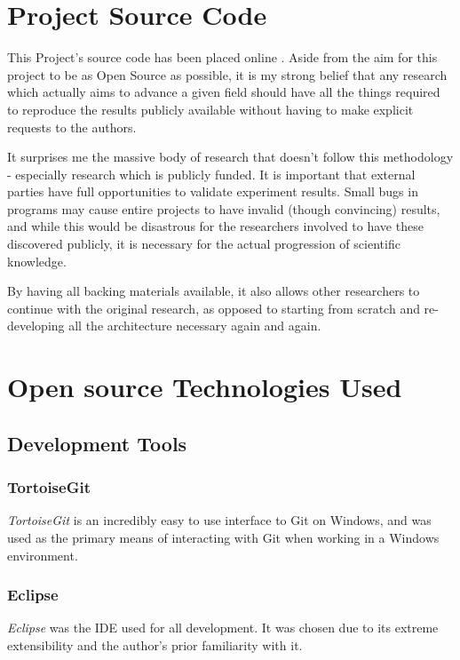 \documentclass[a4paper,11pt]{report}
\begin{document}
\section{Project Source Code}
This Project's source code has been placed online \citep{web:projectsourcecode}. Aside from the aim for this project to be as Open Source as possible, it is my strong belief that any research which actually aims to advance a given field should have all the things required to reproduce the results publicly available without having to make explicit requests to the authors. 

It surprises me the massive body of research that doesn't follow this methodology - especially research which is publicly funded. It is important that external parties have full opportunities to validate experiment results. Small bugs in programs may cause entire projects to have invalid (though convincing) results, and while this would be disastrous for the researchers involved to have these discovered publicly, it is necessary for the actual progression of scientific knowledge.

By having all backing materials available, it also allows other researchers to continue with the original research, as opposed to starting from scratch and re-developing all the architecture necessary again and again.

\section{Open source Technologies Used}
\subsection{Development Tools}
\subsubsection*{TortoiseGit}
\emph{TortoiseGit} \citep{prog:tortoisegit} is an incredibly easy to use interface to Git on Windows, and was used as the primary means of interacting with Git when working in a Windows environment.

\subsubsection*{Eclipse}
\emph{Eclipse} \citep{prog:eclipse} was the IDE used for all development. It was chosen due to its extreme extensibility and the author's prior familiarity with it.
\end{document}
